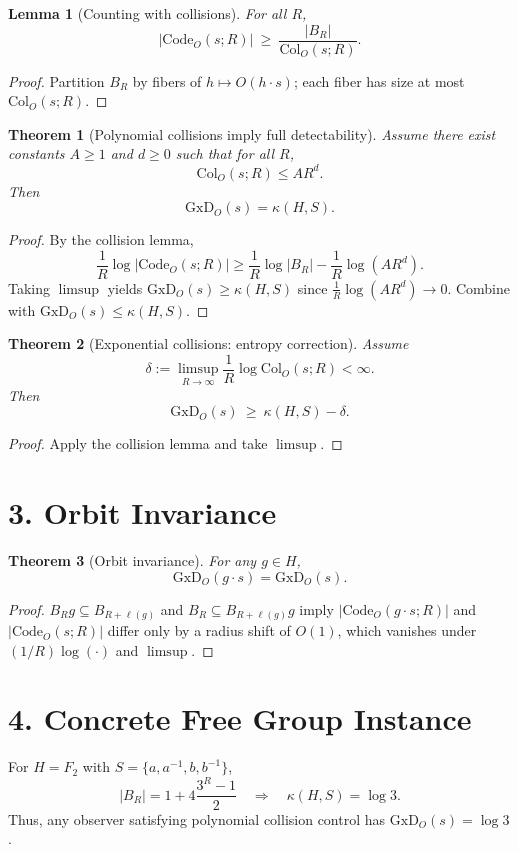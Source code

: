 \documentclass[11pt]{article}
\newtheorem{theorem}{Theorem}
\newtheorem{lemma}{Lemma}
\begin{document}
\begin{lemma}[Counting with collisions]
For all $R$,
\[
|\mathrm{Code}_O(s;R)|\ \ge\ \frac{|B_R|}{\mathrm{Col}_O(s;R)}.
\]
\end{lemma}

\begin{proof}
Partition $B_R$ by fibers of $h\mapsto O(h\cdot s)$; each fiber has size at most $\mathrm{Col}_O(s;R)$.
\end{proof}

\begin{theorem}[Polynomial collisions imply full detectability]
Assume there exist constants $A\ge 1$ and $d\ge 0$ such that for all $R$,
\[
\mathrm{Col}_O(s;R)\le A R^d.
\]
Then
\[
\mathrm{GxD}_O(s)=\kappa(H,S).
\]
\end{theorem}

\begin{proof}
By the collision lemma,
\[
\frac1R\log|\mathrm{Code}_O(s;R)|\ge \frac1R\log|B_R|-\frac1R\log(AR^d).
\]
Taking $\limsup$ yields $\mathrm{GxD}_O(s)\ge \kappa(H,S)$ since $\frac1R\log(AR^d)\to 0$.
Combine with $\mathrm{GxD}_O(s)\le \kappa(H,S)$.
\end{proof}

\begin{theorem}[Exponential collisions: entropy correction]
Assume
\[
\delta := \limsup_{R\to\infty}\frac1R\log \mathrm{Col}_O(s;R) < \infty.
\]
Then
\[
\mathrm{GxD}_O(s)\ \ge\ \kappa(H,S)-\delta.
\]
\end{theorem}

\begin{proof}
Apply the collision lemma and take $\limsup$.
\end{proof}

\section*{3. Orbit Invariance}

\begin{theorem}[Orbit invariance]
For any $g\in H$,
\[
\mathrm{GxD}_O(g\cdot s)=\mathrm{GxD}_O(s).
\]
\end{theorem}

\begin{proof}
$B_R g \subseteq B_{R+\ell(g)}$ and $B_R\subseteq B_{R+\ell(g)}g$ imply
$|\mathrm{Code}_O(g\cdot s;R)|$ and $|\mathrm{Code}_O(s;R)|$ differ only by a radius shift of $O(1)$,
which vanishes under $(1/R)\log(\cdot)$ and $\limsup$.
\end{proof}

\section*{4. Concrete Free Group Instance}

For $H=F_2$ with $S=\{a,a^{-1},b,b^{-1}\}$,
\[
|B_R| = 1 + 4\frac{3^R-1}{2}\quad\Rightarrow\quad \kappa(H,S)=\log 3.
\]
Thus, any observer satisfying polynomial collision control has $\mathrm{GxD}_O(s)=\log 3$.
\end{document}
